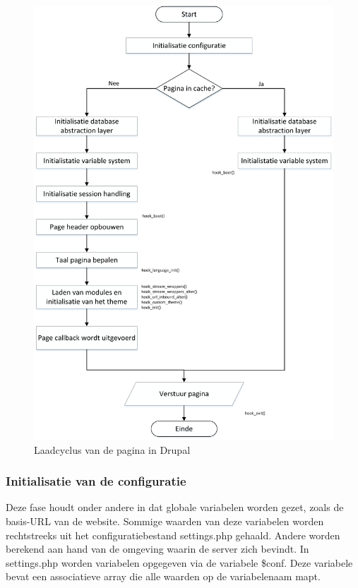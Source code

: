 \begin{figure}
\centering
\includegraphics[width=1\textwidth]{fig/drupalPageRendering}
\caption{Laadcyclus van de pagina in Drupal}
\label{fig:drupalPageRendering}
\end{figure}

\subsubsection{Initialisatie van de configuratie}
Deze fase houdt onder andere in dat globale variabelen worden gezet, zoals de basis-URL van de website. Sommige waarden van deze variabelen worden rechtstreeks uit het configuratiebestand settings.php gehaald. Andere worden berekend aan hand van de omgeving waarin de server zich bevindt. In settings.php worden variabelen opgegeven via de variabele \$conf. Deze variabele bevat een associatieve array die alle waarden op de variabelenaam mapt.

